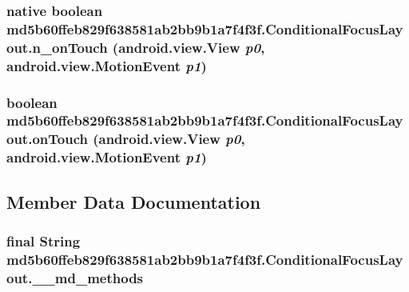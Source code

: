 \hypertarget{classmd5b60ffeb829f638581ab2bb9b1a7f4f3f_1_1_conditional_focus_layout_ea86f4bf8bf09bc69ae8979eeaf200dc}{
\subsubsection[{n\_\-onTouch}]{\setlength{\rightskip}{0pt plus 5cm}native boolean md5b60ffeb829f638581ab2bb9b1a7f4f3f.ConditionalFocusLayout.n\_\-onTouch (android.view.View {\em p0}, \/  android.view.MotionEvent {\em p1})}}
\label{classmd5b60ffeb829f638581ab2bb9b1a7f4f3f_1_1_conditional_focus_layout_ea86f4bf8bf09bc69ae8979eeaf200dc}


\hypertarget{classmd5b60ffeb829f638581ab2bb9b1a7f4f3f_1_1_conditional_focus_layout_199b53215336706c0125f8e3b12b1dfc}{
\subsubsection[{onTouch}]{\setlength{\rightskip}{0pt plus 5cm}boolean md5b60ffeb829f638581ab2bb9b1a7f4f3f.ConditionalFocusLayout.onTouch (android.view.View {\em p0}, \/  android.view.MotionEvent {\em p1})}}
\label{classmd5b60ffeb829f638581ab2bb9b1a7f4f3f_1_1_conditional_focus_layout_199b53215336706c0125f8e3b12b1dfc}




\subsection{Member Data Documentation}
\hypertarget{classmd5b60ffeb829f638581ab2bb9b1a7f4f3f_1_1_conditional_focus_layout_e43b6d64754789fb4cba8a55c430534a}{
\subsubsection[{\_\-\_\-md\_\-methods}]{\setlength{\rightskip}{0pt plus 5cm}final String {\bf md5b60ffeb829f638581ab2bb9b1a7f4f3f.ConditionalFocusLayout.\_\-\_\-md\_\-methods}}}
\label{classmd5b60ffeb829f638581ab2bb9b1a7f4f3f_1_1_conditional_focus_layout_e43b6d64754789fb4cba8a55c430534a}


